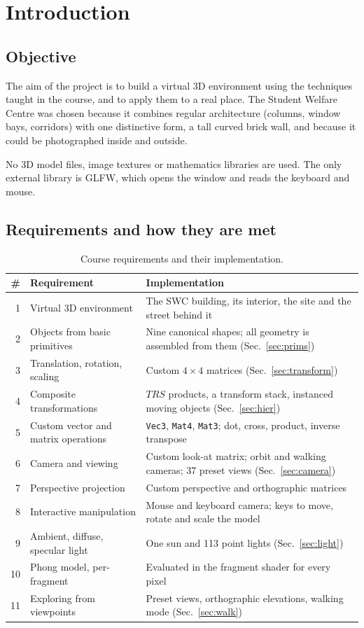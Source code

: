 \documentclass[11pt,a4paper]{article}
\newcommand{\code}[1]{\texttt{#1}}
\begin{document}
\section{Introduction}
\subsection{Objective}
The aim of the project is to build a virtual 3D environment using the
techniques taught in the course, and to apply them to a real place. The
Student Welfare Centre was chosen because it combines regular architecture
(columns, window bays, corridors) with one distinctive form, a tall curved
brick wall, and because it could be photographed inside and outside.

No 3D model files, image textures or mathematics libraries are used. The
only external library is GLFW, which opens the window and reads the
keyboard and mouse.

\subsection{Requirements and how they are met}
\begin{table}[H]
\centering\small
\begin{tabularx}{\textwidth}{@{}rL{5.0cm}X@{}}
\toprule
\# & Requirement & Implementation \\
 & Virtual 3D environment & The SWC building, its interior, the site and the street behind it \\
2 & Objects from basic primitives & Nine canonical shapes; all geometry is assembled from them (Sec.~\ref{sec:prims}) \\
3 & Translation, rotation, scaling & Custom $4\times4$ matrices (Sec.~\ref{sec:transform}) \\
4 & Composite transformations & $T R S$ products, a transform stack, instanced moving objects (Sec.~\ref{sec:hier}) \\
5 & Custom vector and matrix operations & \code{Vec3}, \code{Mat4}, \code{Mat3}; dot, cross, product, inverse transpose \\
6 & Camera and viewing & Custom look-at matrix; orbit and walking cameras; 37 preset views (Sec.~\ref{sec:camera}) \\
7 & Perspective projection & Custom perspective and orthographic matrices \\
8 & Interactive manipulation & Mouse and keyboard camera; keys to move, rotate and scale the model \\
9 & Ambient, diffuse, specular light & One sun and 113 point lights (Sec.~\ref{sec:light}) \\
10 & Phong model, per-fragment & Evaluated in the fragment shader for every pixel \\
11 & Exploring from viewpoints & Preset views, orthographic elevations, walking mode (Sec.~\ref{sec:walk}) \\
\bottomrule
\end{tabularx}
\caption{Course requirements and their implementation.}
\end{table}
\end{document}
